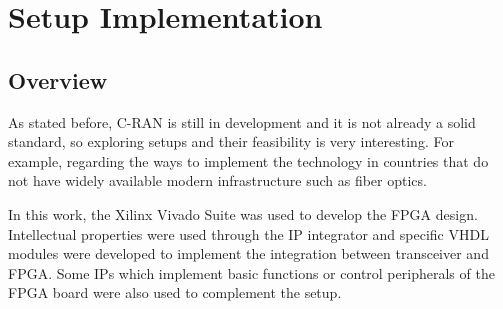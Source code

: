 \chapter{Setup Implementation}
\label{chap:implementation}

\section{Overview}

As stated before, C-RAN is still in development and it is not already a solid
standard, so exploring setups and their feasibility is very interesting. For
example, regarding the ways to implement the technology in countries that do
not have widely available modern infrastructure such as fiber optics.

%
%

In this work, the Xilinx Vivado Suite was used to develop the FPGA design.
Intellectual properties were used through the IP integrator and specific VHDL
modules were developed to implement the integration between transceiver and
FPGA. Some IPs which implement
basic functions or control peripherals of the FPGA board were also used to
complement the setup.

